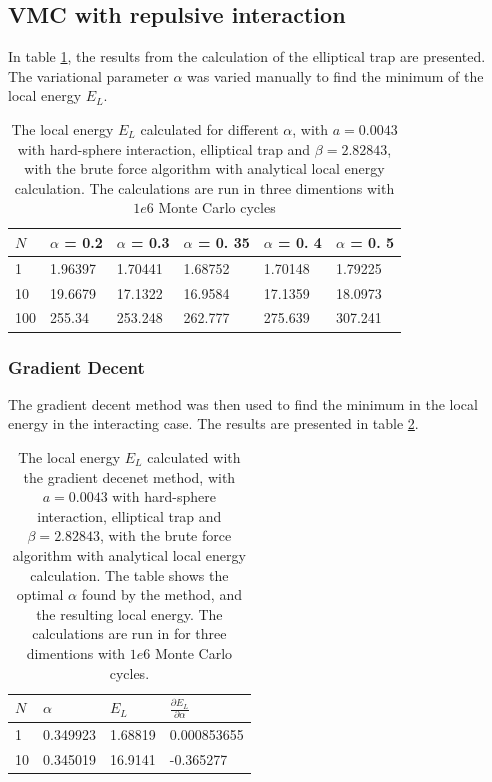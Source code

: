 \documentclass[norsk,a4paper,12pt]{article}
\begin{document}
\subsection{VMC with repulsive interaction}
In table \ref{tab:EL_calc_repulsive_pot}, the results from the calculation of the elliptical trap are presented. The variational parameter $\alpha$ was varied manually to find the minimum of the local energy $E_L$.

\begin{table} [H]
	\centering
	\caption{The local energy $E_L$ calculated for different $\alpha$, with $a=0.0043$  with hard-sphere interaction,  elliptical trap and $\beta=2.82843$, with the brute force algorithm with analytical local energy calculation.  The calculations are run in three dimentions with $1e6$ Monte Carlo cycles}
	\begin{tabularx}{\textwidth}{X|XXXXX} \hline
		\label{tab:EL_calc_repulsive_pot}
		$N$ & $\alpha$ = 0.2 & $\alpha$ = 0.3  & $\alpha$ = 0. 35 & $\alpha$ = 0. 4 & $\alpha$ = 0. 5   \\ \hline
		1 & 1.96397 & 1.70441  & 1.68752 & 1.70148 & 1.79225\\
		10 & 19.6679 & 17.1322 & 16.9584 &17.1359 & 18.0973\\
		100 & 255.34 & 253.248 & 262.777 & 275.639 & 307.241\\ \hline
	\end{tabularx}
\end{table}

\subsubsection{Gradient Decent}
The gradient decent method was then used to find the minimum in the local energy in the interacting case. The results are presented in table \ref{tab:EL_calc_gradientdecent}.

\begin{table} [H]
	\centering
	\caption{The local energy $E_L$ calculated with the gradient decenet method, with $a=0.0043$  with hard-sphere interaction,  elliptical trap and $\beta=2.82843$, with the brute force algorithm with analytical local energy calculation. The table shows the optimal $\alpha$ found by the method, and the resulting local energy. The calculations are run in for  three dimentions with $1e6$ Monte Carlo cycles.}
	\begin{tabularx}{\textwidth}{X|XXX} \hline
		\label{tab:EL_calc_gradientdecent}
		$N$ & $\alpha $ & $E_L$  & $\frac{\partial E_L}{\partial \alpha}$   \\ \hline
		1 & 0.349923 & 1.68819 & 0.000853655 \\
		10 &0.345019 & 16.9141 & -0.365277 \\ \hline
	\end{tabularx}
\end{table}
\end{document}

